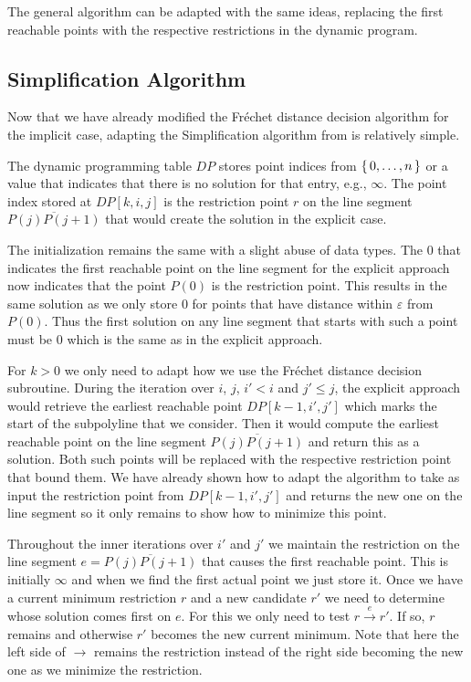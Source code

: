 The general algorithm can be adapted with the same ideas, replacing the first reachable points with the respective restrictions in the dynamic program. 

\subsection{Simplification Algorithm}
Now that we have already modified the Fréchet distance decision algorithm for the implicit case, adapting the Simplification algorithm from \citeauthor{on_optimal_polyline_simplification_using_the_hausdorff_and_frechet_distance} is relatively simple. 

The dynamic programming table \(DP\) stores point indices from \(\set{0, \dots, n}\) or a value that indicates that there is no solution for that entry, e.g., \(\infty\). The point index stored at \(DP[k,i,j]\) is the restriction point \(r\) on the line segment \(\overline{P(j)P(j+1)}\) that would create the solution in the explicit case. 

The initialization remains the same with a slight abuse of data types. The \(0\) that indicates the first reachable point on the line segment for the explicit approach now indicates that the point \(P(0)\) is the restriction point. This results in the same solution as we only store \(0\) for points that have distance within \(\varepsilon\) from \(P(0)\). Thus the first solution on any line segment that starts with such a point must be \(0\) which is the same as in the explicit approach.

For \(k > 0\) we only need to adapt how we use the Fréchet distance decision subroutine. During the iteration over \(i\), \(j\), \(i' < i\) and \(j' \leq j\), the explicit approach would retrieve the earliest reachable point \(DP[k-1, i', j']\) which marks the start of the subpolyline that we consider. Then it would compute the earliest reachable point on the line segment \(\overline{P(j)P(j+1)}\) and return this as a solution. Both such points will be replaced with the respective restriction point that bound them. We have already shown how to adapt the algorithm to take as input the restriction point from \(DP[k-1,i',j']\) and returns the new one on the line segment so it only remains to show how to minimize this point. 

Throughout the inner iterations over \(i'\) and \(j'\) we maintain the restriction on the line segment \(e = \overline{P(j)P(j+1)}\) that causes the first reachable point. This is initially \(\infty\) and when we find the first actual point we just store it. Once we have a current minimum restriction \(r\) and a new candidate \(r'\) we need to determine whose solution comes first on \(e\). For this we only need to test \(r \overset e\to r'\). If so, \(r\) remains and otherwise \(r'\) becomes the new current minimum. Note that here the left side of \(\to\) remains the restriction instead of the right side becoming the new one as we minimize the restriction.

